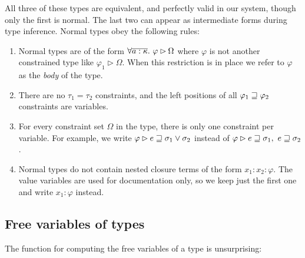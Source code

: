 All three of these types are equivalent, and perfectly valid in our system, though only the first is normal. The last two can appear as intermediate forms during type inference. Normal types obey the following rules:
\begin{enumerate}
\item	Normal types are of the form $\forall \overline{a : \kappa}. \ \varphi \rhd \Omega$ where $\varphi$ 
	is not another constrained type like $\varphi_1 \rhd \Omega$. When this restriction is in place
	we refer to $\varphi$ as the \emph{body} of the type.

\item	There are no $\tau_1 = \tau_2$ constraints, and the left positions of all $\varphi_1 \sqsupseteq \varphi_2$
	constraints are variables.

\item	For every constraint set $\Omega$ in the type, there is only one constraint per variable.
	For example, we write $\varphi \rhd e \sqsupseteq \sigma_1 \lor \sigma_2$ instead
	of $\varphi \rhd e \sqsupseteq \sigma_1, \  e \sqsupseteq \sigma_2$.


\item	Normal types do not contain nested closure terms of the form $x_1 : x_2 : \varphi$. The value variables
	are used for documentation only, so we keep just the first one and write $x_1 : \varphi$ instead.
\end{enumerate}


\clearpage{}
\subsection{Free variables of types}
\label{Inference:Language:free-variables}
The function for computing the free variables of a type is unsurprising:

\bigskip
{}

